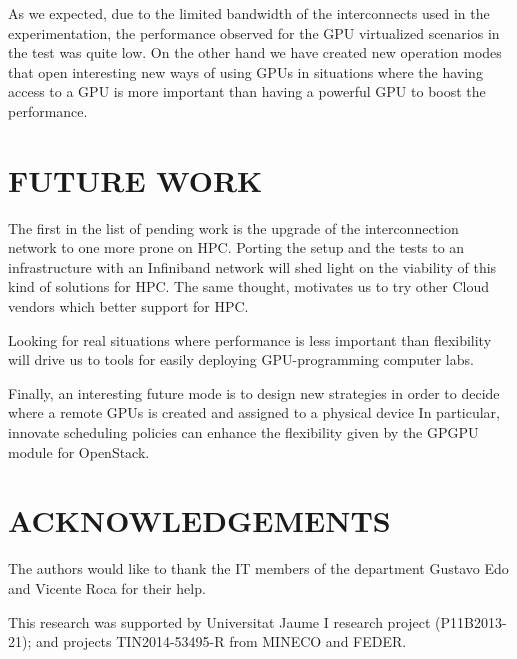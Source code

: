 \documentclass[a4paper,twoside]{article}
\begin{document}
As we expected, due to the limited bandwidth of the interconnects used in the experimentation, the performance observed for the GPU virtualized scenarios in the test was quite low.
On the other hand we have created new operation modes that open interesting new ways of using GPUs in situations where the having access to a GPU is more important than having a powerful GPU to boost the performance.

\section{\uppercase{Future work}}
\label{sec:future}
The first in the list of pending work is the upgrade of the interconnection network to one more prone on HPC.
Porting the setup and the tests to an infrastructure with an Infiniband network will shed light on the viability of this kind of solutions for HPC.
The same thought, motivates us to try other Cloud vendors which better support for HPC.

Looking for real situations where performance is less important than flexibility will drive us 
to tools for easily deploying GPU-programming computer labs.

Finally, an interesting future mode is to design new strategies in order to decide where a remote GPUs is created and assigned to a physical device
In particular, innovate scheduling policies can enhance the flexibility given by the GPGPU module for OpenStack.

\section*{\uppercase{Acknowledgements}}
The authors would like to thank the IT members of the department Gustavo Edo and Vicente Roca for their help.

This research was supported by Universitat Jaume I research project (P11B2013-21); and projects
TIN2014-53495-R from MINECO and FEDER.


{\small
}
\end{document}
